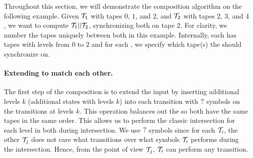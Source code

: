 \begin{example}
  Throughout this section, we will demonstrate the composition algorithm on the following example.
  Given \nft $\mathcal{T}_1$ with tapes $0$, $1$, and $2$, and $\mathcal{T}_2$ with tapes $2$, $3$, and $4$, we want to compute $\mathcal{T}_1 || \mathcal{T}_2$, synchronizing both \nfts on tape $2$.
  For clarity, we number the tapes uniquely between both \nfts in this example. Internally, each \nft has tapes with levels from $0$ to $2$ and for each \nft, we specify which tape(s) the \nfts should synchronize on.
\end{example}

\paragraph{Extending \nfts to match each other.}
The first step of the composition is to extend the input \nfts by inserting additional levels $k$ (additional states with levels $k$) into each transition with $?$ symbols on the transitions at levels $k$.
This operation balances out the \nfts so both have the same tapes in the same order.
This allows us to perform the classic \nfa intersection for each level in both \nfts during \nft intersection.
We use $?$ symbols since for each \nft $\mathcal{T}_i$, the other \nft $\mathcal{T}_j$ does not care what transitions over what symbols $\mathcal{T}_i$ performs during the intersection.
Hence, from the point of view $\mathcal{T}_j$, $\mathcal{T}_i$ can perform any transition.

